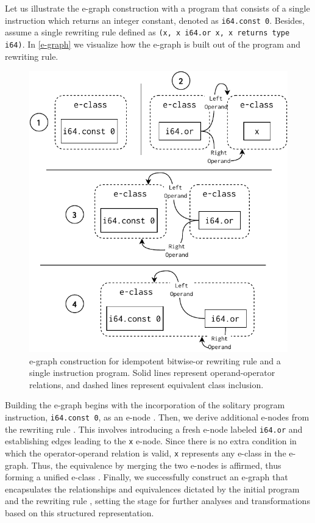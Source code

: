 Let us illustrate the e-graph construction with a program that consists of a single instruction which returns an integer constant, denoted as \texttt{i64.const 0}. 
Besides, assume a single rewriting rule defined as \texttt{(x, x i64.or x, x returns type i64)}.
In \autoref{e-graph} we visualize how the e-graph is built out of the program and rewriting rule.

\begin{figure}
  \centering
  \includegraphics[width=0.7\linewidth]{figures/egraph1.pdf}
  \caption{e-graph construction for idempotent bitwise-or rewriting rule and a single instruction \wasm program. Solid lines represent operand-operator relations, and dashed lines represent equivalent class inclusion. }
\label{e-graph}
\end{figure}

Building the e-graph begins with the incorporation of the solitary program instruction, \texttt{i64.const 0}, as an e-node .
Then, we derive additional e-nodes from the rewriting rule . 
This involves introducing a fresh e-node labeled \texttt{i64.or} and establishing edges leading to the \texttt{x} e-node.
Since there is no extra condition in which the operator-operand relation is valid, \texttt{x} represents any e-class in the e-graph.
Thus, the equivalence by merging the two e-nodes is affirmed, thus forming a unified e-class . 
Finally, we successfully construct an e-graph that encapsulates the relationships and equivalences dictated by the initial program and the rewriting rule , setting the stage for further analyses and transformations based on this structured representation.

